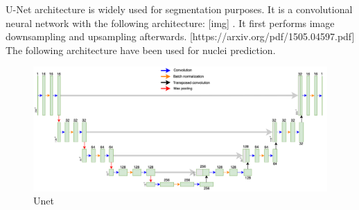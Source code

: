 U-Net architecture is widely used for segmentation purposes. It is a convolutional neural network with the following architecture: [img] . It first performs image downsampling and upsampling afterwards.
[https://arxiv.org/pdf/1505.04597.pdf] The following architecture have been used for nuclei prediction. 
\begin{figure}[htb]
	\begin{center}
		\includegraphics[width=\linewidth]{bilder/Unet.png}
		\caption{Unet}\label{fig:unet}
	\end{center}
\end{figure}
